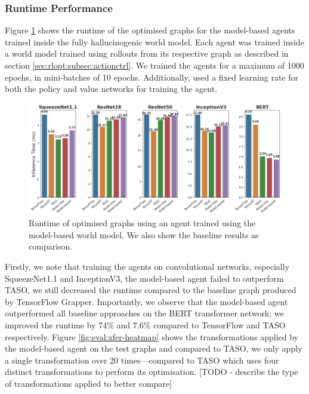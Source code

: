 \subsubsection{Runtime Performance}

Figure \ref{fig:eval:world-model-runtimes} shows the runtime of the optimised graphs for the model-based agents trained inside the fully hallucinogenic world model. Each agent was trained inside a world model trained using rollouts from its respective graph as described in section \ref{sec:rlopt:subsec:actionctrl}. We trained the agents for a maximum of 1000 epochs, in mini-batches of 10 epochs. Additionally, used a fixed learning rate for both the policy and value networks for training the agent.

\begin{figure}[h]
  \centering
  \includegraphics[width=1\columnwidth]{sections/5evaluation/images/runtimes_all.png}
  \caption[Runtimes of optimised graphs using a model-based controller]{Runtime of optimised graphs using an agent trained using the model-based world model. We also show the baseline results as comparison.}
  \label{fig:eval:world-model-runtimes}
\end{figure}

Firstly, we note that training the agents on convolutional networks, especially SqueezeNet1.1 and InceptionV3, the model-based agent failed to outperform TASO, we still decreased the runtime compared to the baseline graph produced by TensorFlow Grapper. Importantly, we observe that the model-based agent outperformed all baseline approaches on the BERT transformer network; we improved the runtime by 74\% and 7.6\% compared to TensorFlow and TASO respectively. Figure \ref{fig:eval:xfer-heatmap} shows the transformations applied by the model-based agent on the test graphs and compared to TASO, we only apply a single transformation over 20 times---compared to TASO which uses four distinct transformations to perform its optimisation. [TODO - describe the type of transformations applied to better compare]

